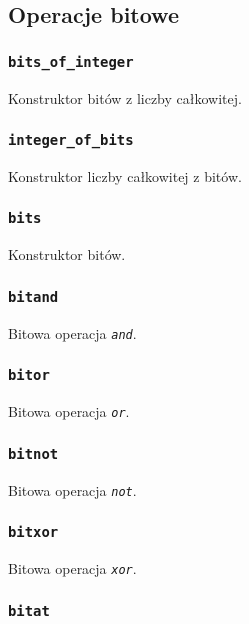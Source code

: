 \subsection{Operacje bitowe}
\label{viua_vm_ops_bit_ops}

\subsubsection{\texttt{bits\_of\_integer}}

Konstruktor bitów z liczby całkowitej.

\subsubsection{\texttt{integer\_of\_bits}}

Konstruktor liczby całkowitej z bitów.

\subsubsection{\texttt{bits}}

Konstruktor bitów.

\subsubsection{\texttt{bitand}}

Bitowa operacja \emph{\texttt{and}}.

\subsubsection{\texttt{bitor}}

Bitowa operacja \emph{\texttt{or}}.

\subsubsection{\texttt{bitnot}}

Bitowa operacja \emph{\texttt{not}}.

\subsubsection{\texttt{bitxor}}

Bitowa operacja \emph{\texttt{xor}}.

\subsubsection{\texttt{bitat}}

